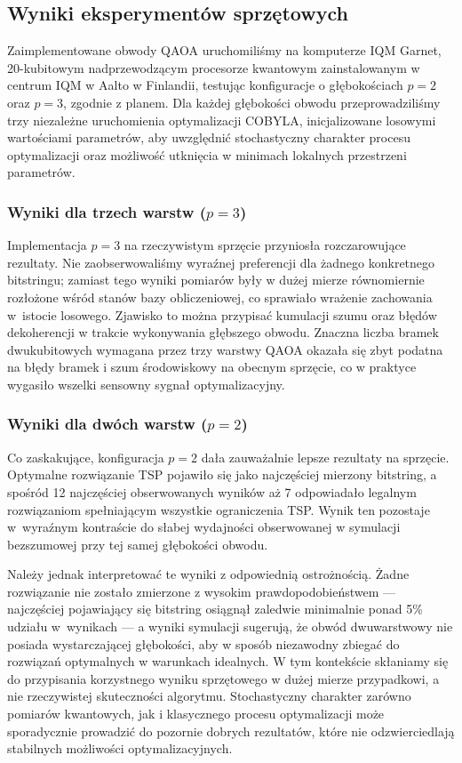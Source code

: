 \subsection{Wyniki eksperymentów sprzętowych}

Zaimplementowane obwody QAOA uruchomiliśmy na komputerze IQM Garnet, 20-kubitowym nadprzewodzącym procesorze kwantowym zainstalowanym w centrum IQM w Aalto w Finlandii, testując konfiguracje o głębokościach $p=2$ oraz $p=3$, zgodnie z planem. Dla każdej głębokości obwodu przeprowadziliśmy trzy niezależne uruchomienia optymalizacji COBYLA, inicjalizowane losowymi wartościami parametrów, aby uwzględnić stochastyczny charakter procesu optymalizacji oraz możliwość utknięcia w minimach lokalnych przestrzeni parametrów.

\subsubsection*{Wyniki dla trzech warstw ($p=3$)}

Implementacja $p=3$ na rzeczywistym sprzęcie przyniosła rozczarowujące rezultaty. Nie zaobserwowaliśmy wyraźnej preferencji dla żadnego konkretnego bitstringu; zamiast tego wyniki pomiarów były w dużej mierze równomiernie rozłożone wśród stanów bazy obliczeniowej, co sprawiało wrażenie zachowania w~istocie losowego. Zjawisko to można przypisać kumulacji szumu oraz błędów dekoherencji w trakcie wykonywania głębszego obwodu. Znaczna liczba bramek dwukubitowych wymagana przez trzy warstwy QAOA okazała się zbyt podatna na błędy bramek i szum środowiskowy na obecnym sprzęcie, co w praktyce wygasiło wszelki sensowny sygnał optymalizacyjny.

\subsubsection*{Wyniki dla dwóch warstw ($p=2$)}

Co zaskakujące, konfiguracja $p=2$ dała zauważalnie lepsze rezultaty na sprzęcie. Optymalne rozwiązanie TSP pojawiło się jako najczęściej mierzony bitstring, a spośród 12 najczęściej obserwowanych wyników aż 7 odpowiadało legalnym rozwiązaniom spełniającym wszystkie ograniczenia TSP. Wynik ten pozostaje w~wyraźnym kontraście do słabej wydajności obserwowanej w symulacji bezszumowej przy tej samej głębokości obwodu.

Należy jednak interpretować te wyniki z odpowiednią ostrożnością. Żadne rozwiązanie nie zostało zmierzone z wysokim prawdopodobieństwem — najczęściej pojawiający się bitstring osiągnął zaledwie minimalnie ponad 5\% udziału w~wynikach — a wyniki symulacji sugerują, że obwód dwuwarstwowy nie posiada wystarczającej głębokości, aby w sposób niezawodny zbiegać do rozwiązań optymalnych w warunkach idealnych. W tym kontekście skłaniamy się do przypisania korzystnego wyniku sprzętowego w dużej mierze przypadkowi, a nie rzeczywistej skuteczności algorytmu. Stochastyczny charakter zarówno pomiarów kwantowych, jak i klasycznego procesu optymalizacji może sporadycznie prowadzić do pozornie dobrych rezultatów, które nie odzwierciedlają stabilnych możliwości optymalizacyjnych.

